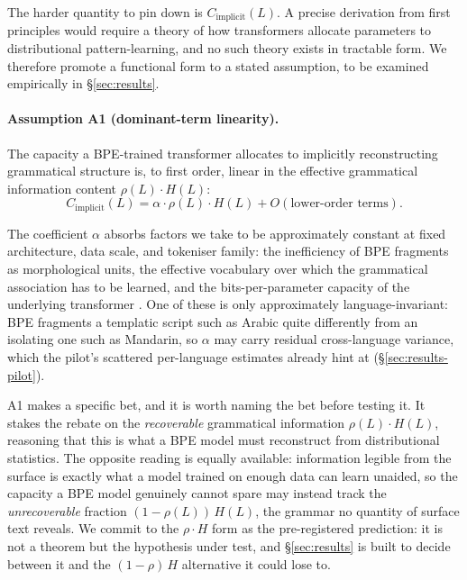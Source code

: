 The harder quantity to pin down is $C_{\mathrm{implicit}}(L)$. A precise derivation from first principles would require a theory of how transformers allocate parameters to distributional pattern-learning, and no such theory exists in tractable form. We therefore promote a functional form to a stated assumption, to be examined empirically in \S\ref{sec:results}.

\paragraph{Assumption A1 (dominant-term linearity).}
The capacity a BPE-trained transformer allocates to implicitly reconstructing grammatical structure is, to first order, linear in the effective grammatical information content $\rho(L) \cdot H(L)$:
\begin{equation}
C_{\mathrm{implicit}}(L) = \alpha \cdot \rho(L) \cdot H(L) + O(\text{lower-order terms}).
\label{eq:A1}
\end{equation}

The coefficient $\alpha$ absorbs factors we take to be approximately constant at fixed architecture, data scale, and tokeniser family: the inefficiency of BPE fragments as morphological units, the effective vocabulary over which the grammatical association has to be learned, and the bits-per-parameter capacity of the underlying transformer \citep{allenzhu2024}. One of these is only approximately language-invariant: BPE fragments a templatic script such as Arabic quite differently from an isolating one such as Mandarin, so $\alpha$ may carry residual cross-language variance, which the pilot's scattered per-language estimates already hint at (\S\ref{sec:results-pilot}).

A1 makes a specific bet, and it is worth naming the bet before testing it. It stakes the rebate on the \emph{recoverable} grammatical information $\rho(L) \cdot H(L)$, reasoning that this is what a BPE model must reconstruct from distributional statistics. The opposite reading is equally available: information legible from the surface is exactly what a model trained on enough data can learn unaided, so the capacity a BPE model genuinely cannot spare may instead track the \emph{unrecoverable} fraction $(1-\rho(L))\,H(L)$, the grammar no quantity of surface text reveals. We commit to the $\rho \cdot H$ form as the pre-registered prediction: it is not a theorem but the hypothesis under test, and \S\ref{sec:results} is built to decide between it and the $(1-\rho)\,H$ alternative it could lose to.

